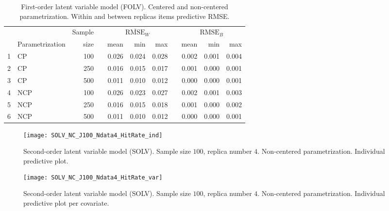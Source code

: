 %
\begin{table}[H]
	\centering
	\begin{tabular}{rlrrrrrrrrr}
		\hline
		& & Sample && \multicolumn{3}{c}{ $\overline{\text{RMSE}}_{W}$ } && \multicolumn{3}{c}{ $\text{RMSE}_{B}$ } \\
		\cmidrule(rl){5-7} \cmidrule(rl){9-11}  
		& Parametrization & size  && mean & min & max && mean & min & max \\ 
		\hline\hline
		1 & CP & 100 && 0.026 & 0.024 & 0.028 && 0.002 & 0.001 & 0.004 \\   
		2 & CP & 250 && 0.016 & 0.015 & 0.017 && 0.001 & 0.000 & 0.001 \\
		3 & CP & 500 && 0.011 & 0.010 & 0.012 && 0.000 & 0.000 & 0.001 \\ 
		\hline
		4 & NCP & 100 && 0.026 & 0.023 & 0.027 && 0.002 & 0.001 & 0.003 \\
		5 & NCP & 250 && 0.016 & 0.015 & 0.018 && 0.001 & 0.000 & 0.002 \\  
		6 & NCP & 500 && 0.011 & 0.010 & 0.012 && 0.000 & 0.000 & 0.001 \\
		\hline
	\end{tabular}
	\caption[First-order latent variable model (FOLV). Centered and non-centered parametrization. Within and between replicas items predictive RMSE.]%
	{First-order latent variable model (FOLV). Centered and non-centered parametrization. Within and between replicas items predictive RMSE.}
	\label{tab:FOLV_accuracy_items}
\end{table}
%
\begin{figure}[H]
	\centering
	\texttt{[image: SOLV\_NC\_J100\_Ndata4\_HitRate\_ind]}
	\caption[Second-order latent variable model (SOLV). Sample size $100$, replica number $4$. Non-centered parametrization. Individual predictive plot.]%
	{Second-order latent variable model (SOLV). Sample size $100$, replica number $4$. Non-centered parametrization. Individual predictive plot.}
	\label{fig:SOLV_NC_hitrate_ind}
\end{figure}
%
\begin{figure}[H]
	\centering
	\texttt{[image: SOLV\_NC\_J100\_Ndata4\_HitRate\_var]}
	\caption[Second-order latent variable model (SOLV). Sample size $100$, replica number $4$. Non-centered parametrization. Individual predictive plot per covariate.]%
	{Second-order latent variable model (SOLV). Sample size $100$, replica number $4$. Non-centered parametrization. Individual predictive plot per covariate.}
	\label{fig:SOLV_NC_hitrate_var}
\end{figure}
